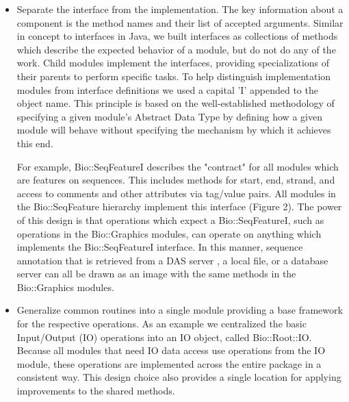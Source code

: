 \documentclass[12pt]{article}
\begin{document}
\begin{itemize}

\item Separate the interface from the implementation.  The key
information about a component is the method names and their list of
accepted arguments.  Similar in concept to interfaces in Java, we
built interfaces as collections of methods which describe the expected
behavior of a module, but do not do any of the work.  Child modules
implement the interfaces, providing specializations of their parents
to perform specific tasks.  To help distinguish implementation modules
from interface definitions we used a capital 'I' appended to the
object name.  This principle is based on the well-established
methodology of specifying a given module's Abstract Data Type by
defining how a given module will behave without specifying the
mechanism by which it achieves this end.

For example, Bio::SeqFeatureI describes the "contract" for all modules
which are features on sequences.  This includes methods for
start, end, strand, and access to comments and other attributes via tag/value
pairs.  All modules in the Bio::SeqFeature hierarchy implement this
interface (Figure 2).  The power of this design is that operations
which expect a Bio::SeqFeatureI, such as operations in the
Bio::Graphics modules, can operate on anything which implements the
Bio::SeqFeatureI interface.  In this manner, sequence annotation that
is retrieved from a DAS server \cite{das}, a local file, or a database
server can all be drawn as an image with the same methods in the
Bio::Graphics modules.

\item Generalize common routines into a single module providing a base
framework for the respective operations.  As an example we centralized
the basic Input/Output (IO) operations into an IO object, called
Bio::Root::IO.  Because all modules that need IO data access use
operations from the IO module, these operations are implemented across
the entire package in a consistent way.  This design choice also
provides a single location for applying improvements to the shared
methods.  


\end{itemize}
\end{document}
